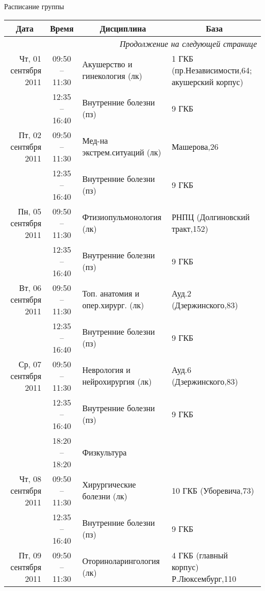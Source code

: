 \documentclass[a4paper,10pt,notitlepage]{report}
\begin{document}
\begin{center}

{\Large Расписание группы }
{\footnotesize
\begin{longtable}{r|c|l|l|}

\hline \multicolumn{1}{|c|}{\textbf{Дата}} &
\multicolumn{1}{c|}{\textbf{Время}} &
\multicolumn{1}{c|}{\textbf{Дисциплина}} &
\multicolumn{1}{c|}{\textbf{База}} \\
\hline
\hline
\endhead

\multicolumn{4}{r|}{{\slshape Продолжение на следующей странице}} \\
\endfoot

\hline
\endlastfoot

\hline Чт, 01 сентября 2011
  & 09:50 -- 11:30 & Акушерство и гинекология (лк) & 1 ГКБ (пр.Независимости,64; акушерский корпус) \\ \cline{2-4}
  & 12:35 -- 16:40 & Внутренние болезни (пз) & 9 ГКБ \\ \cline{2-4}
\hline Пт, 02 сентября 2011
  & 09:50 -- 11:30 & Мед-на экстрем.ситуаций (лк) & Машерова,26 \\ \cline{2-4}
  & 12:35 -- 16:40 & Внутренние болезни (пз) & 9 ГКБ \\ \cline{2-4}
\hline Пн, 05 сентября 2011
  & 09:50 -- 11:30 & Фтизиопульмонология (лк) & РНПЦ (Долгиновский тракт,152) \\ \cline{2-4}
  & 12:35 -- 16:40 & Внутренние болезни (пз) & 9 ГКБ \\ \cline{2-4}
\hline Вт, 06 сентября 2011
  & 09:50 -- 11:30 & Топ. анатомия и опер.хирург. (лк) & Ауд.2 (Дзержинского,83) \\ \cline{2-4}
  & 12:35 -- 16:40 & Внутренние болезни (пз) & 9 ГКБ \\ \cline{2-4}
\hline Ср, 07 сентября 2011
  & 09:50 -- 11:30 & Неврология и нейрохирургия (лк) & Ауд.6 (Дзержинского,83) \\ \cline{2-4}
  & 12:35 -- 16:40 & Внутренние болезни (пз) & 9 ГКБ \\ \cline{2-4}
  & 18:20 -- 18:20 & Физкультура  &  \\ \cline{2-4}
\hline Чт, 08 сентября 2011
  & 09:50 -- 11:30 & Хирургические болезни (лк) & 10 ГКБ (Уборевича,73) \\ \cline{2-4}
  & 12:35 -- 16:40 & Внутренние болезни (пз) & 9 ГКБ \\ \cline{2-4}
\hline Пт, 09 сентября 2011
  & 09:50 -- 11:30 & Оториноларингология (лк) & 4 ГКБ (главный корпус) Р.Люксембург,110 \\ \cline{2-4}

\end{longtable}}
\end{center}
\end{document}

